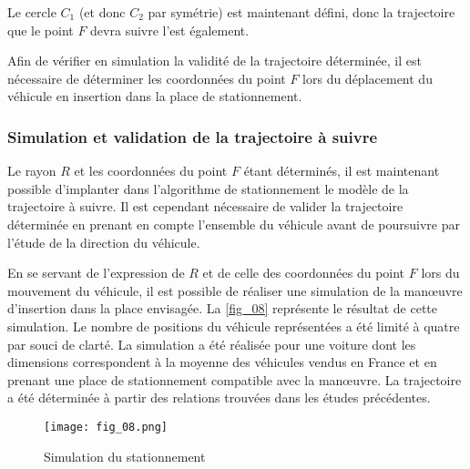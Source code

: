 Le cercle $C_1$ (et donc $C_2$ par symétrie) est maintenant défini, donc la trajectoire que le point $F$ devra suivre l’est également.

Afin de vérifier en simulation la validité de la trajectoire déterminée, il est nécessaire de déterminer les coordonnées du point $F$ lors du déplacement du véhicule en insertion dans la place de stationnement.

\subsubsection{ Simulation et validation de la trajectoire à suivre}
\ifprof
\begin{corrige}
\end{corrige}
\else
\fi

Le rayon $R$ et les coordonnées du point $F$ étant déterminés, il est maintenant possible d’implanter dans l’algorithme de stationnement le modèle de la trajectoire à suivre. Il est cependant nécessaire de valider la trajectoire
déterminée en prenant en compte l’ensemble du véhicule avant de poursuivre par l’étude de la direction du
véhicule.

En se servant de l’expression de $R$ et de celle des coordonnées du point $F$ lors du mouvement du véhicule, il est
possible de réaliser une simulation de la manœuvre d’insertion dans la place envisagée.
La \autoref{fig_08} représente le résultat de cette simulation. Le nombre de positions du véhicule représentées a été limité
à quatre par souci de clarté. La simulation a été réalisée pour une voiture dont les dimensions correspondent
à la moyenne des véhicules vendus en France et en prenant une place de stationnement compatible avec la
manœuvre. La trajectoire a été déterminée à partir des relations trouvées dans les études précédentes.

\begin{figure}[H]
\centering
\texttt{[image: fig\_08.png]}
\caption{Simulation du stationnement \label{fig_08}}
\end{figure}

\ifprof
\begin{corrige}
\end{corrige}
\else
\fi

